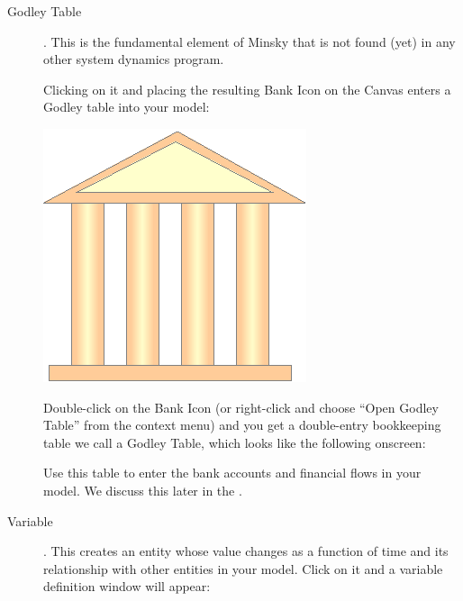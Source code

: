 \begin{description}
\item[Godley Table] . \label{GodleyTable} This is the
fundamental element of Minsky that is not found (yet) in any other
system dynamics program. 

Clicking on it and placing the resulting Bank Icon on the Canvas
enters a Godley table into your model:

\begin{center}
\includegraphics{images/NewItem29.eps}
\end{center}

Double-click on the Bank Icon (or right-click and choose ``Open Godley
Table'' from the context menu) and you get a double-entry bookkeeping
table we call a Godley Table, which looks like the following onscreen:

\begin{center}
\end{center}

 
Use this table to enter the bank accounts and financial flows in your model. We discuss this later in the .

\item[Variable]  . \label{Variable} This creates an entity
whose value changes as a function of time and its relationship with
other entities in your model. Click on it and a variable definition
window will appear:

\begin{center}
\end{center}


\end{description}
